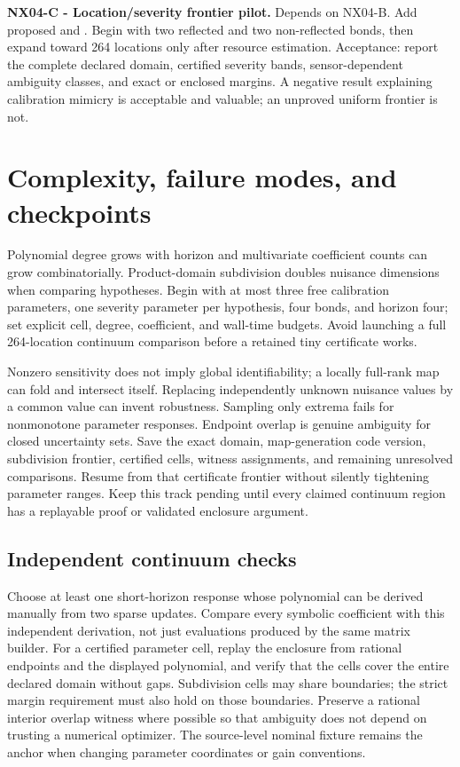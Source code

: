\documentclass[
  11pt,
  a4paper,
]{report}
\let\nxtexttt\texttt
\renewcommand{\texttt}[1]{\nxtexttt{\seqsplit{#1}}}
\begin{document}
\textbf{NX04-C - Location/severity frontier pilot.} Depends on NX04-B.
Add proposed \texttt{scripts/thermal\_severity.py} and
\texttt{results/thermal\_severity.json}. Begin with two reflected and
two non-reflected bonds, then expand toward 264 locations only after
resource estimation. Acceptance: report the complete declared domain,
certified severity bands, sensor-dependent ambiguity classes, and exact
or enclosed margins. A negative result explaining calibration mimicry is
acceptable and valuable; an unproved uniform frontier is not.

\hypertarget{complexity-failure-modes-and-checkpoints}{%
\section{Complexity, failure modes, and
checkpoints}\label{complexity-failure-modes-and-checkpoints}}

Polynomial degree grows with horizon and multivariate coefficient counts
can grow combinatorially. Product-domain subdivision doubles nuisance
dimensions when comparing hypotheses. Begin with at most three free
calibration parameters, one severity parameter per hypothesis, four
bonds, and horizon four; set explicit cell, degree, coefficient, and
wall-time budgets. Avoid launching a full 264-location continuum
comparison before a retained tiny certificate works.

Nonzero sensitivity does not imply global identifiability; a locally
full-rank map can fold and intersect itself. Replacing independently
unknown nuisance values by a common value can invent robustness.
Sampling only extrema fails for nonmonotone parameter responses.
Endpoint overlap is genuine ambiguity for closed uncertainty sets. Save
the exact domain, map-generation code version, subdivision frontier,
certified cells, witness assignments, and remaining unresolved
comparisons. Resume from that certificate frontier without silently
tightening parameter ranges. Keep this track pending until every claimed
continuum region has a replayable proof or validated enclosure argument.

\hypertarget{independent-continuum-checks}{%
\subsection{Independent continuum
checks}\label{independent-continuum-checks}}

Choose at least one short-horizon response whose polynomial can be
derived manually from two sparse updates. Compare every symbolic
coefficient with this independent derivation, not just evaluations
produced by the same matrix builder. For a certified parameter cell,
replay the enclosure from rational endpoints and the displayed
polynomial, and verify that the cells cover the entire declared domain
without gaps. Subdivision cells may share boundaries; the strict margin
requirement must also hold on those boundaries. Preserve a rational
interior overlap witness where possible so that ambiguity does not
depend on trusting a numerical optimizer. The source-level nominal
fixture remains the anchor when changing parameter coordinates or gain
conventions.
\end{document}
